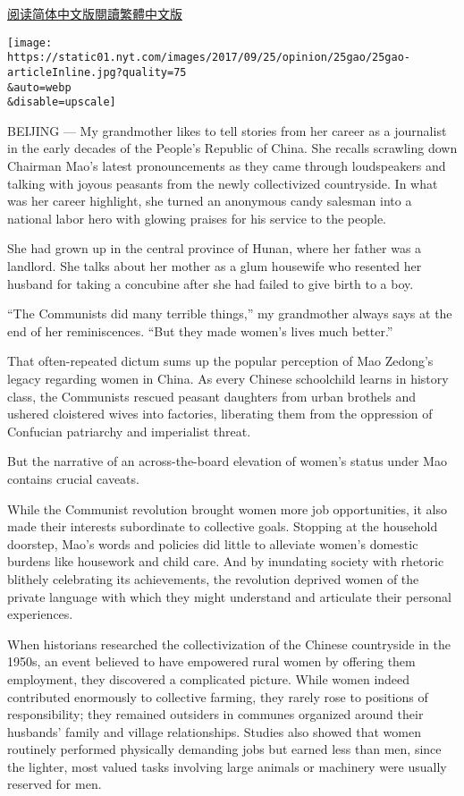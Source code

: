 \href{https://cn.nytimes.com/opinion/20170926/women-china-communist-revolution/}{阅读简体中文版}\href{https://cn.nytimes.com/opinion/20170926/women-china-communist-revolution/zh-hant/}{閱讀繁體中文版}

\texttt{[image: https://static01.nyt.com/images/2017/09/25/opinion/25gao/25gao-articleInline.jpg?quality=75\\\&auto=webp\\\&disable=upscale]}

BEIJING --- My grandmother likes to tell stories from her career as a
journalist in the early decades of the People's Republic of China. She
recalls scrawling down Chairman Mao's latest pronouncements as they came
through loudspeakers and talking with joyous peasants from the newly
collectivized countryside. In what was her career highlight, she turned
an anonymous candy salesman into a national labor hero with glowing
praises for his service to the people.

She had grown up in the central province of Hunan, where her father was
a landlord. She talks about her mother as a glum housewife who resented
her husband for taking a concubine after she had failed to give birth to
a boy.

``The Communists did many terrible things,'' my grandmother always says
at the end of her reminiscences. ``But they made women's lives much
better.''

That often-repeated dictum sums up the popular perception of Mao
Zedong's legacy regarding women in China. As every Chinese schoolchild
learns in history class, the Communists rescued peasant daughters from
urban brothels and ushered cloistered wives into factories, liberating
them from the oppression of Confucian patriarchy and imperialist threat.

But the narrative of an across-the-board elevation of women's status
under Mao contains crucial caveats.

While the Communist revolution brought women more job opportunities, it
also made their interests subordinate to collective goals. Stopping at
the household doorstep, Mao's words and policies did little to alleviate
women's domestic burdens like housework and child care. And by
inundating society with rhetoric blithely celebrating its achievements,
the revolution deprived women of the private language with which they
might understand and articulate their personal experiences.

When historians researched the collectivization of the Chinese
countryside in the 1950s, an event believed to have empowered rural
women by offering them employment, they discovered a complicated
picture. While women indeed contributed enormously to collective
farming, they rarely rose to positions of responsibility; they remained
outsiders in communes organized around their husbands' family and
village relationships. Studies also showed that women routinely
performed physically demanding jobs but earned less than men, since the
lighter, most valued tasks involving large animals or machinery were
usually reserved for men.

